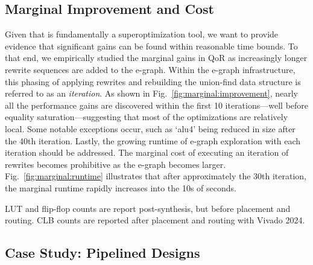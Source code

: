 \subsection{Marginal Improvement and Cost}\label{sec:results:margin}

Given that \shortname{} is fundamentally a superoptimization tool, we want to
provide evidence that significant gains can be found within reasonable time
bounds. To that end, we empirically studied the marginal gains in QoR as
increasingly longer rewrite sequences are added to the e-graph. Within the
e-graph infrastructure, this phasing of applying rewrites and rebuilding the
union-find data structure is referred to as an \textit{iteration}. As shown in
Fig.~\ref{fig:marginal:improvement}, nearly all the performance gains are
discovered within the first 10 iterations---well before equality
saturation---suggesting that most of the optimizations are relatively local.
Some notable exceptions occur, such as `alu4' being reduced in size after the
40th iteration. Lastly, the growing runtime of e-graph exploration with each
iteration should be addressed. The marginal cost of executing an iteration of
rewrites becomes prohibitive as the e-graph becomes larger.
Fig.~\ref{fig:marginal:runtime} illustrates that after approximately the 30th
iteration, the marginal runtime rapidly increases into the 10s of seconds.

\begin{table}[t]
    \centering
    \caption{LUT and flip-flop counts are report post-synthesis, but before placement and routing. CLB counts are reported after placement and routing with Vivado 2024.}\label{tab:multiply}
\end{table}

\subsection{Case Study: Pipelined Designs}\label{sec:results:retiming}

